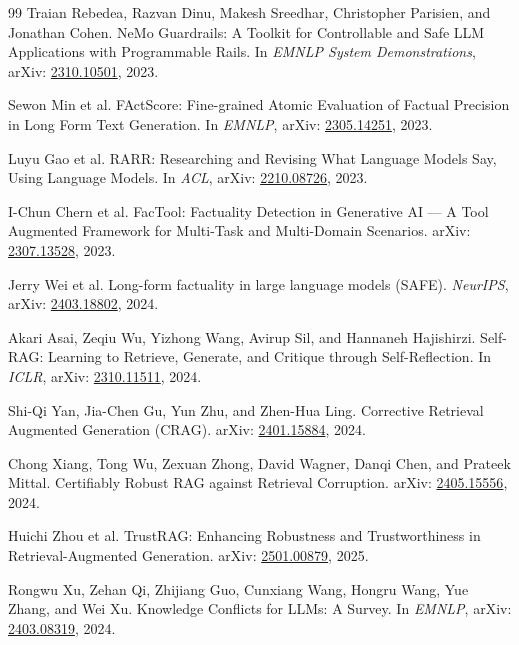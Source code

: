 \documentclass[11pt,a4paper]{article}
\begin{document}
\begin{thebibliography}{99}
Traian Rebedea, Razvan Dinu, Makesh Sreedhar, Christopher Parisien, and Jonathan Cohen.
\newblock NeMo Guardrails: A Toolkit for Controllable and Safe LLM Applications with Programmable Rails.
\newblock In \emph{EMNLP System Demonstrations}, arXiv: \href{https://arxiv.org/abs/2310.10501}{2310.10501}, 2023.

Sewon Min et al.
\newblock FActScore: Fine-grained Atomic Evaluation of Factual Precision in Long Form Text Generation.
\newblock In \emph{EMNLP}, arXiv: \href{https://arxiv.org/abs/2305.14251}{2305.14251}, 2023.

Luyu Gao et al.
\newblock RARR: Researching and Revising What Language Models Say, Using Language Models.
\newblock In \emph{ACL}, arXiv: \href{https://arxiv.org/abs/2210.08726}{2210.08726}, 2023.

I-Chun Chern et al.
\newblock FacTool: Factuality Detection in Generative AI --- A Tool Augmented Framework for Multi-Task and Multi-Domain Scenarios.
\newblock arXiv: \href{https://arxiv.org/abs/2307.13528}{2307.13528}, 2023.

Jerry Wei et al.
\newblock Long-form factuality in large language models (SAFE).
\newblock \emph{NeurIPS}, arXiv: \href{https://arxiv.org/abs/2403.18802}{2403.18802}, 2024.

Akari Asai, Zeqiu Wu, Yizhong Wang, Avirup Sil, and Hannaneh Hajishirzi.
\newblock Self-RAG: Learning to Retrieve, Generate, and Critique through Self-Reflection.
\newblock In \emph{ICLR}, arXiv: \href{https://arxiv.org/abs/2310.11511}{2310.11511}, 2024.

Shi-Qi Yan, Jia-Chen Gu, Yun Zhu, and Zhen-Hua Ling.
\newblock Corrective Retrieval Augmented Generation (CRAG).
\newblock arXiv: \href{https://arxiv.org/abs/2401.15884}{2401.15884}, 2024.

Chong Xiang, Tong Wu, Zexuan Zhong, David Wagner, Danqi Chen, and Prateek Mittal.
\newblock Certifiably Robust RAG against Retrieval Corruption.
\newblock arXiv: \href{https://arxiv.org/abs/2405.15556}{2405.15556}, 2024.

Huichi Zhou et al.
\newblock TrustRAG: Enhancing Robustness and Trustworthiness in Retrieval-Augmented Generation.
\newblock arXiv: \href{https://arxiv.org/abs/2501.00879}{2501.00879}, 2025.

Rongwu Xu, Zehan Qi, Zhijiang Guo, Cunxiang Wang, Hongru Wang, Yue Zhang, and Wei Xu.
\newblock Knowledge Conflicts for LLMs: A Survey.
\newblock In \emph{EMNLP}, arXiv: \href{https://arxiv.org/abs/2403.08319}{2403.08319}, 2024.


\end{thebibliography}
\end{document}
